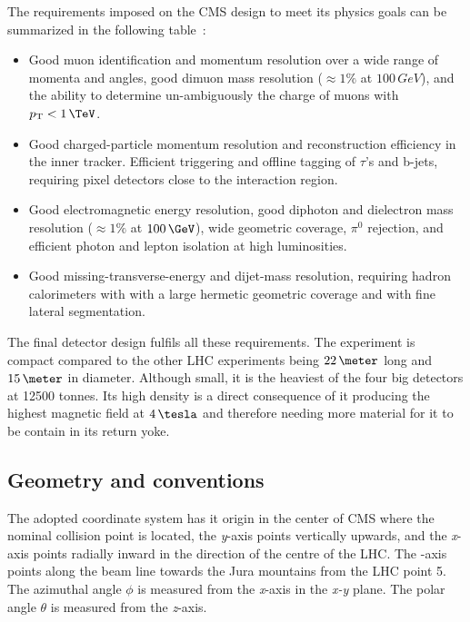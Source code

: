 The requirements imposed on the \gls{CMS} design to meet its physics goals can be summarized in the following table~\cite{ARTICLE:CMSTechnicalProposal,ARTICLE:TheCMSExperiment}:

\begin{itemize}
  \item Good muon identification and momentum resolution over a wide range of momenta and angles, good dimuon mass resolution ($\approx 1\%$ at $100\,GeV$), and the ability to determine un-ambiguously the charge of muons with $\pt<1\,\TeV$.
  \item Good charged-particle momentum resolution and reconstruction efficiency in the inner tracker. Efficient triggering and offline tagging of $\tau$'s and b-jets, requiring pixel detectors close to the interaction region.
  \item Good electromagnetic energy resolution, good diphoton and dielectron mass resolution ($\approx 1\%$ at $100\,\GeV$), wide geometric coverage, $\pi^0$ rejection, and efficient photon and lepton isolation at high luminosities.
  \item Good missing-transverse-energy and dijet-mass resolution, requiring hadron calorimeters with with a large hermetic geometric coverage and with fine lateral segmentation.
\end{itemize}

The final detector design fulfils all these requirements. The experiment is compact compared to the other \gls{LHC} experiments being $22\,\meter$ long and $15\,\meter$ in diameter. Although small, it is the heaviest of the four big detectors at 12500 tonnes. Its high density is a direct consequence of it producing the highest magnetic field at $4\,\tesla$ and therefore needing more material for it to be contain in its return yoke. 

\subsection{Geometry and conventions}
\label{SECTION:ExperimentalApparatus_CMS_GeometryConventions}


The adopted coordinate system has it origin in the center of \gls{CMS} where the nominal collision point is located, the \textit{y}-axis points vertically upwards, and the \textit{x}-axis points radially inward in the direction of the centre of the \gls{LHC}. The -axis points along the beam line towards the Jura mountains from the \gls{LHC} point 5. The azimuthal angle $\phi$ is measured from the \textit{x}-axis in the \textit{x-y} plane. The polar angle $\theta$ is measured from the \textit{z}-axis.

